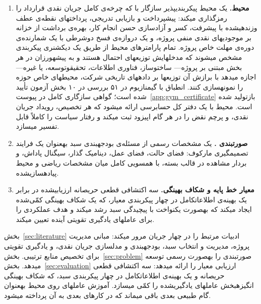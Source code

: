 \begin{enumerate}[leftmargin=*, label=\textbf{م\arabic*.}]

    \item \textbf{محیط.}
    یک محیط  پیکربندی\zwnj{}پذیر سازگار با 
    که چرخه‌ی کامل جریان نقدی قرارداد  را رمزگذاری می\zwnj{}کند:
    پیش\zwnj{}پرداخت و بازیابی تدریجی، پرداخت\zwnj{}های نقطه‌ی عطف
    وزن\zwnj{}دهی\zwnj{}شده با پیشرفت، کسر و آزادسازی حسن انجام کار،
    بهره‌ی برداشت از خزانه بر موجودی\zwnj{}های نقدی منفی پروژه،
    و یک دروازه‌ی فسخ دوشرطی با یک شمارنده‌ی دوره‌ی مهلت
    خاص پروژه.
    تمام پارامترهای محیط از طریق یک دیکشنری پیکربندی
    مشخص می\zwnj{}شوند که مدخل\zwnj{}هایش توزیع\zwnj{}های احتمال هستند
    و به پیشه\zwnj{}ورزان در هر بخش مبتنی بر پروژه---
    ساخت\zwnj{}وساز، فناوری اطلاعات، تحقیق\zwnj{}و\zwnj{}توسعه، یا غیره---
    اجازه می\zwnj{}دهد با برازش آن توزیع\zwnj{}ها بر داده\zwnj{}های تاریخی شرکت،
    محیط\zwnj{}های خاص حوزه را نمونه\zwnj{}سازی کنند.
    انطباق با  گیمنازیوم در ۵۱ بررسی در ۱۰ بخش آزمون
    تأیید شده است؛ گواهی سازگاری کامل در پیوست~\ref{app:gym_certificate}
    بازتولید شده است.
    محیط با یک دفتر کل حسابرسی  ارائه می\zwnj{}شود که
    هر تخصیص، رویداد جریان نقدی، و پرچم نقض را در هر گام اپیزود
    ثبت می\zwnj{}کند و رفتار سیاست را کاملاً قابل تفسیر می\zwnj{}سازد.

    \item \textbf{صورت\zwnj{}بندی .}
    یک مشخصات رسمی از مسئله‌ی بودجه\zwnj{}بندی سبد به\zwnj{}عنوان یک
    فرایند تصمیم\zwnj{}گیری مارکوف: فضای حالت، فضای عمل،
    دینامیک گذار، سیگنال پاداش، و بردار مشاهده
    در قالب بسته، با همسویی کامل میان مشخصات ریاضی
    و محیط پیاده\zwnj{}سازی\zwnj{}شده.

    \item \textbf{معیار خط پایه و شکاف بهینگی.}
    سه اکتشافی قطعی حریصانه ارزیابی\zwnj{}شده در برابر یک بهینه‌ی
    اطلاعات\zwnj{}کامل در چهار پیکربندی معیار،
    که یک شکاف بهینگی کمّی‌شده ایجاد می\zwnj{}کند که به\zwnj{}صورت یکنواخت
    با پیچیدگی سبد رشد می\zwnj{}کند و هدف عملکردی را برای
    عامل\zwnj{}های یادگیری تقویتی آینده تعیین می\zwnj{}کند.

\end{enumerate}

بخش~\ref{sec:literature} ادبیات مرتبط را در چهار جریان مرور می\zwnj{}کند:
مبانی مدیریت پروژه، مدیریت و انتخاب سبد،
بودجه\zwnj{}بندی  و مدل\zwnj{}سازی جریان نقدی،
و یادگیری تقویتی برای تخصیص منابع ترتیبی.
بخش~\ref{sec:problem} صورت\zwnj{}بندی  را به\zwnj{}صورت رسمی
توسعه می\zwnj{}دهد.
بخش~\ref{sec:evaluation} ارزیابی معیار را ارائه می\zwnj{}دهد:
سه اکتشافی قطعی حریصانه و یک بهینه‌ی اطلاعات\zwnj{}کامل
در چهار پیکربندی سبد، که شکاف بهینگی انگیزه\zwnj{}بخش
عامل\zwnj{}های یادگیری\zwnj{}شده را کمّی می\zwnj{}سازد.
آموزش عامل\zwnj{}های  روی محیط به\zwnj{}عنوان گام طبیعی بعدی
باقی می\zwnj{}ماند که در کارهای بعدی به آن پرداخته می\zwnj{}شود.